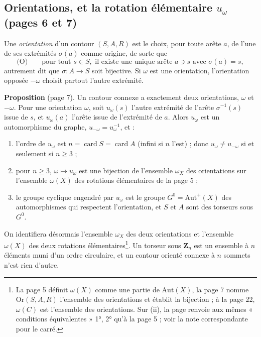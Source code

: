 \documentclass[11pt,a4paper]{article}
\begin{document}
\subsection*{Orientations, et la rotation élémentaire $u_\omega$ (pages 6 et 7)}

Une \emph{orientation} d'un contour $(S, A, R)$ est le choix, pour toute arête
$a$, de l'une de ses extrémités $\sigma(a)$ comme origine, de sorte que
\[
  \text{(O)} \qquad \text{pour tout } s \in S, \text{ il existe une unique
  arête } a \ni s \text{ avec } \sigma(a) = s,
\]
autrement dit que $\sigma : A \to S$ soit bijective. Si $\omega$ est une
orientation, l'orientation opposée $-\omega$ choisit partout l'autre
extrémité.

\textbf{Proposition} (page 7). Un contour connexe a exactement deux
orientations, $\omega$ et $-\omega$. Pour une orientation $\omega$, soit
$u_\omega(s)$ l'autre extrémité de l'arête $\sigma^{-1}(s)$ issue de $s$, et
$u_\omega(a)$ l'arête issue de l'extrémité de $a$. Alors $u_\omega$ est un
automorphisme du graphe, $u_{-\omega} = u_\omega^{-1}$, et :
\begin{enumerate}
\item[(i)] l'ordre de $u_\omega$ est $n = \operatorname{card} S =
\operatorname{card} A$ (infini si $n$ l'est) ; donc $u_\omega \neq u_{-\omega}$
si et seulement si $n \geq 3$ ;
\item[(ii)] pour $n \geq 3$, $\omega \mapsto u_\omega$ est une bijection de
l'ensemble $\omega_X$ des orientations sur l'ensemble $\omega(X)$ des rotations
élémentaires de la page 5 ;
\item[(iii)] le groupe cyclique engendré par $u_\omega$ est le groupe $G^0 =
\mathrm{Aut}^{+}(X)$ des automorphismes qui respectent l'orientation, et $S$
et $A$ sont des torseurs sous $G^0$.
\end{enumerate}
On identifiera désormais l'ensemble $\omega_X$ des deux orientations et
l'ensemble $\omega(X)$ des deux rotations élémentaires\footnote{La page 5
définit $\omega(X)$ comme une partie de $\mathrm{Aut}(X)$, la page 7 nomme
$\mathrm{Or}(S,A,R)$ l'ensemble des orientations et établit la bijection ; à
la page 22, $\omega(C)$ est l'ensemble des orientations. Sur (ii), la page
renvoie aux mêmes « conditions équivalentes » 1°, 2° qu'à la page 5 ; voir la
note correspondante pour le carré.}. Un torseur sous $\mathbf{Z}_n$ est un
ensemble à $n$ éléments muni d'un ordre circulaire, et un contour orienté
connexe à $n$ sommets n'est rien d'autre.
\end{document}
